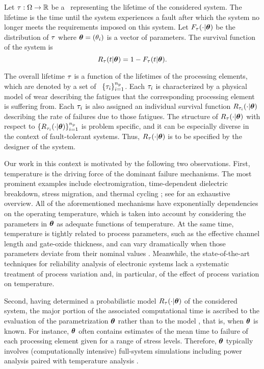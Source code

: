 Let $\tau: \Omega \to \mathbb{R}$ be a \rv\ representing the lifetime of the considered system.
The lifetime is the time until the system experiences a fault after which the system no longer meets the requirements imposed on this system.
Let $F_\tau(\cdot | \bm{\theta})$ be the distribution of $\tau$ where $\bm{\theta} = (\theta_i)$ is a vector of parameters.
The survival function of the system is
\[
  R_\tau(t | \bm{\theta}) = 1 - F_\tau(t | \bm{\theta}).
\]

The overall lifetime $\tau$ is a function of the lifetimes of the processing elements, which are denoted by a set of \rvs\ $\{ \tau_i \}_{i = 1}^{n_\text{p}}$.
Each $\tau_i$ is characterized by a physical model of wear \cite{jedec} describing the fatigues that the corresponding processing element is suffering from.
Each $\tau_i$ is also assigned an individual survival function $R_{\tau_i}(\cdot | \bm{\theta})$ describing the rate of failures due to those fatigues.
The structure of $R_\tau(\cdot | \bm{\theta})$ with respect to $\{ R_{\tau_i}(\cdot | \bm{\theta}) \}_{i = 1}^{n_\text{p}}$ is problem specific, and it can be especially diverse in the context of fault-tolerant systems.
Thus, $R_\tau(\cdot | \bm{\theta})$ is to be specified by the designer of the system.

Our work in this context is motivated by the following two observations.
First, temperature is the driving force of the dominant failure mechanisms.
The most prominent examples include electromigration, time-dependent dielectric breakdown, stress migration, and thermal cycling \cite{xiang2010}; see \cite{jedec} for an exhaustive overview.
All of the aforementioned mechanisms have exponentially dependencies on the operating temperature, which is taken into account by considering the parameters in $\bm{\theta}$ as adequate functions of temperature.
At the same time, temperature is tightly related to process parameters, such as the effective channel length and gate-oxide thickness, and can vary dramatically when those parameters deviate from their nominal values \cite{ukhov2014, juan2012}.
Meanwhile, the state-of-the-art techniques for reliability analysis of electronic systems lack a systematic treatment of process variation and, in particular, of the effect of process variation on temperature.

Second, having determined a probabilistic model $R_\tau(\cdot | \bm{\theta})$ of the considered system, the major portion of the associated computational time is ascribed to the evaluation of the parametrization $\bm{\theta}$ rather than to the model \perse, that is, when $\bm{\theta}$ is known.
For instance, $\bm{\theta}$ often contains estimates of the mean time to failure of each processing element given for a range of stress levels.
Therefore, $\bm{\theta}$ typically involves (computationally intensive) full-system simulations including power analysis paired with temperature analysis \cite{xiang2010}.

